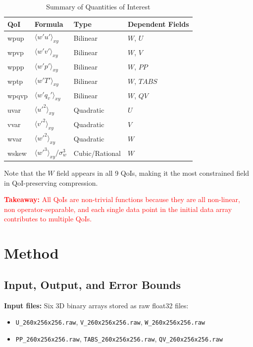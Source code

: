 \documentclass[11pt,a4paper]{article}
\begin{document}
\begin{table}[H]
\centering
\caption{Summary of Quantities of Interest}
\begin{tabular}{llll}
\toprule
\textbf{QoI} & \textbf{Formula} & \textbf{Type} & \textbf{Dependent Fields} \\
\midrule
wpup & $\langle w'u' \rangle_{xy}$ & Bilinear & $W$, $U$ \\
wpvp & $\langle w'v' \rangle_{xy}$ & Bilinear & $W$, $V$ \\
wppp & $\langle w'p' \rangle_{xy}$ & Bilinear & $W$, $PP$ \\
wptp & $\langle w'T' \rangle_{xy}$ & Bilinear & $W$, $TABS$ \\
wpqvp & $\langle w'q_v' \rangle_{xy}$ & Bilinear & $W$, $QV$ \\
uvar & $\langle u'^2 \rangle_{xy}$ & Quadratic & $U$ \\
vvar & $\langle v'^2 \rangle_{xy}$ & Quadratic & $V$ \\
wvar & $\langle w'^2 \rangle_{xy}$ & Quadratic & $W$ \\
wskew & $\langle w'^3 \rangle_{xy} / \sigma_w^3$ & Cubic/Rational & $W$ \\
\bottomrule
\end{tabular}
\end{table}

Note that the $W$ field appears in all 9 QoIs, making it the most constrained field in QoI-preserving compression.

\textcolor{red}{\textbf{Takeaway:} All QoIs are non-trivial functions because they are all non-linear, non operator-separable, and each single data point in the initial data array contributes to multiple QoIs.}

\section{Method}

\subsection{Input, Output, and Error Bounds}

\textbf{Input files:} Six 3D binary arrays stored as raw float32 files:
\begin{itemize}
    \item \texttt{U\_260x256x256.raw}, \texttt{V\_260x256x256.raw}, \texttt{W\_260x256x256.raw}
    \item \texttt{PP\_260x256x256.raw}, \texttt{TABS\_260x256x256.raw}, \texttt{QV\_260x256x256.raw}
\end{itemize}
\end{document}
